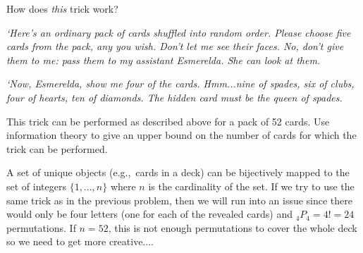 \newpage
\begin{problem}{15}{6}
  How does \textit{this} trick work?
  
  \textnormal{\textit{`Here's an ordinary pack of cards shuffled into random order.  Please choose five cards from the pack, any you wish. Don't let me see their faces. No, don't give them to me: pass them to my assistant Esmerelda.  She can look at them.}}
  
  \textnormal{\textit{`Now, Esmerelda, show me four of the cards.  Hmm...nine of spades, six of clubs, four of hearts, ten of diamonds. The hidden card must be the queen of spades.}}
  
  This trick can be performed as described above for a pack of 52 cards.  Use information theory to give an upper bound on the number of cards for which the trick can be performed.
\end{problem}

A set of unique objects (e.g.,~cards in a deck) can be bijectively mapped to the set of integers $\{1,\ldots,n\}$ where $n$ is the cardinality of the set. If we try to use the same trick as in the previous problem, then we will run into an issue since there would only be four letters (one for each of the revealed cards) and ${}_{4}P_{4} = 4! = 24$ permutations.  If $n=52$, this is not enough permutations to cover the whole deck so we need to get more creative....


